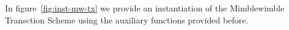 \begin{center}
    \fbox{
    \begin{varwidth}{\textwidth}
        \procedure[linenumbering]{$\procCreateCoin{\varValue}{\varBlindingFactor}$} {
        \varCoin \opFunResult \procCommit{\varValue}{\varBlindingFactor} \\
        \varProof \opFunResult \procProof{\varCoin}{\varValue}{\varBlindingFactor} \\
        \pcreturn (\varCoin, \varProof)
        }
        \procedure[linenumbering]{$\procCreatePreTx{\varMsg}{\funArray{\varCoinInp}}{\funArray{\varCoinOut}}{\funArray{\varProof}}{\varSigContext}{\funArray{\varCommitment}}{\varSignature}{\varTime}$}{
        \pcreturn ( \\
        \varMsg \opAssign \varMsg, \\
        \varInputs \opAssign \funArray{\varCoinInp}, \\
        \varOutputs \opAssign \funArray{\varCoinOut}, \\
        \varProofs \opAssign \funArray{\varProof}, \\
        \varSigContext \opAssign \varSigContext, \\
        \varCommits \opAssign \funArray{\varCommitment}, \\
        \varSignature \opAssign \varSignature, \\
        \varTime \opAssign \varTime
        )
        }
    \end{varwidth}
    }
\end{center}

In figure~\ref{fig:inst-mw-tx} we provide an instantiation of the Mimblewimble Transction Scheme using the auxiliary functions provided before.


